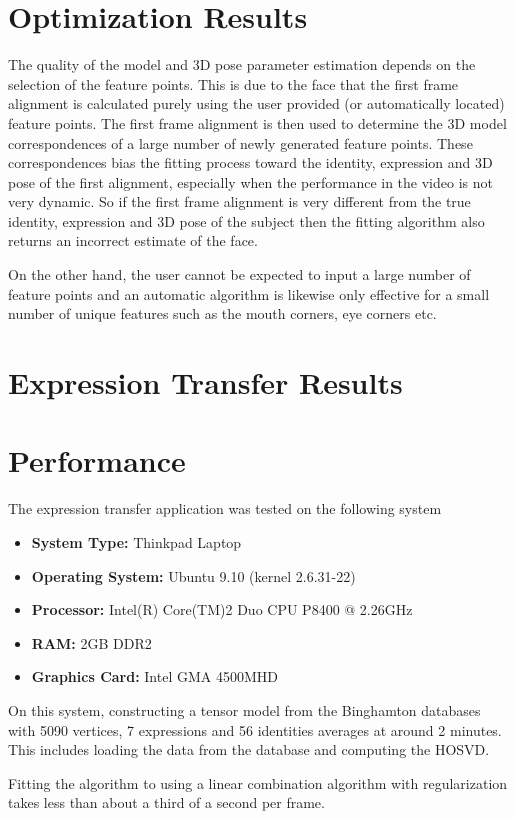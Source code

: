 \documentclass[11pt,a4paper]{report}
\begin{document}
\section{Optimization Results}
The quality of the model and 3D pose parameter estimation depends on the
selection of the feature points. This is due to the face that the first frame
alignment is calculated purely using the user provided (or automatically
located) feature points. The first frame alignment is then used to determine the
3D model correspondences of a
large number of newly generated feature points. These correspondences bias the
fitting process toward the identity, expression and 3D pose of the first
alignment, especially when the performance in the video is not very dynamic. So
if the first frame alignment is
very different from the true identity, expression and 3D pose of the subject
then the fitting algorithm also returns an incorrect estimate of the face.

On the other hand, the user cannot be expected to input a large number of
feature points and an automatic algorithm is likewise only effective for a small
number of unique features such as the mouth corners, eye corners etc.
\section{Expression Transfer Results}

\section{Performance}
The expression transfer application was tested on the following system
\begin{itemize}
\item \textbf{System Type:} Thinkpad Laptop
\item \textbf{Operating System:} Ubuntu 9.10 (kernel 2.6.31-22)
\item \textbf{Processor:} Intel(R) Core(TM)2 Duo CPU P8400 @ 2.26GHz
\item \textbf{RAM:} 2GB DDR2
\item \textbf{Graphics Card:} Intel GMA 4500MHD
\end{itemize}
On this system, constructing a tensor model from the Binghamton databases with
5090 vertices, 7 expressions and 56 identities averages at around 2 minutes. This
includes loading the data from the database and computing the HOSVD.

Fitting the algorithm to using a linear combination algorithm with
regularization takes less than about a third of a second per frame. 
\end{document}
